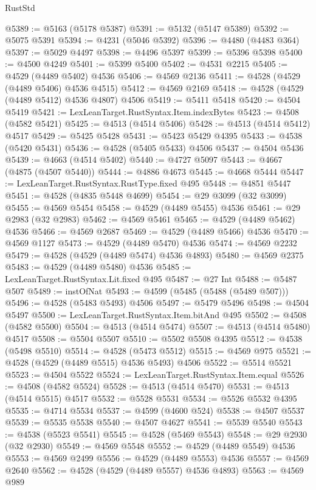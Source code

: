 \begin{lexlean}{RustStd}
\begin{coremodule}
@5389 := @5163 (@5178 @5387)
@5391 := @5132 (@5147 @5389)
@5392 := @5075 @5391
@5394 := @4231 (@5046 @5392)
@5396 := @4480 (@4483 @364)
@5397 := @5029 @4497
@5398 := @4496 @5397
@5399 := @5396 @5398
@5400 := @4500 @4249
@5401 := @5399 @5400
@5402 := @4531 @2215
@5405 := @4529 (@4489 @5402) @4536
@5406 := @4569 @2136
@5411 := @4528 (@4529 (@4489 @5406) @4536 @4515)
@5412 := @4569 @2169
@5418 := @4528 (@4529 (@4489 @5412) @4536 @4807) @4506
@5419 := @5411 @5418
@5420 := @4504 @5419
@5421 := LexLeanTarget.RustSyntax.Item.indexBytes
@5423 := @4508 (@4582 @5421)
@5425 := @4513 (@4514 @5406)
@5428 := @4513 (@4514 @5412) @4517
@5429 := @5425 @5428
@5431 := @5423 @5429 @4395
@5433 := @4538 (@5420 @5431)
@5436 := @4528 (@5405 @5433) @4506
@5437 := @4504 @5436
@5439 := @4663 (@4514 @5402)
@5440 := @4727 @5097
@5443 := @4667 (@4875 (@4507 @5440))
@5444 := @4886 @4673
@5445 := @4668 @5444
@5447 := LexLeanTarget.RustSyntax.RustType.fixed @495
@5448 := @4851 @5447
@5451 := @4528 (@4835 @5448 @4699)
@5454 := @29 @3099 (@32 @3099)
@5455 := @4569 @5454
@5458 := @4529 (@4489 @5455) @4536
@5461 := @29 @2983 (@32 @2983)
@5462 := @4569 @5461
@5465 := @4529 (@4489 @5462) @4536
@5466 := @4569 @2687
@5469 := @4529 (@4489 @5466) @4536
@5470 := @4569 @1127
@5473 := @4529 (@4489 @5470) @4536
@5474 := @4569 @2232
@5479 := @4528 (@4529 (@4489 @5474) @4536 @4893)
@5480 := @4569 @2375
@5483 := @4529 (@4489 @5480) @4536
@5485 := LexLeanTarget.RustSyntax.Lit.fixed @495
@5487 := @27 Int
@5488 := @5487 @507
@5489 := instOfNat
@5493 := @4599 (@5485 (@5488 (@5489 @507)))
@5496 := @4528 (@5483 @5493) @4506
@5497 := @5479 @5496
@5498 := @4504 @5497
@5500 := LexLeanTarget.RustSyntax.Item.bitAnd @495
@5502 := @4508 (@4582 @5500)
@5504 := @4513 (@4514 @5474)
@5507 := @4513 (@4514 @5480) @4517
@5508 := @5504 @5507
@5510 := @5502 @5508 @4395
@5512 := @4538 (@5498 @5510)
@5514 := @4528 (@5473 @5512)
@5515 := @4569 @975
@5521 := @4528 (@4529 (@4489 @5515) @4536 @5493) @4506
@5522 := @5514 @5521
@5523 := @4504 @5522
@5524 := LexLeanTarget.RustSyntax.Item.equal
@5526 := @4508 (@4582 @5524)
@5528 := @4513 (@4514 @5470)
@5531 := @4513 (@4514 @5515) @4517
@5532 := @5528 @5531
@5534 := @5526 @5532 @4395
@5535 := @4714 @5534
@5537 := @4599 (@4600 @524)
@5538 := @4507 @5537
@5539 := @5535 @5538
@5540 := @4507 @4627
@5541 := @5539 @5540
@5543 := @4538 (@5523 @5541)
@5545 := @4528 (@5469 @5543)
@5548 := @29 @2930 (@32 @2930)
@5549 := @4569 @5548
@5552 := @4529 (@4489 @5549) @4536
@5553 := @4569 @2499
@5556 := @4529 (@4489 @5553) @4536
@5557 := @4569 @2640
@5562 := @4528 (@4529 (@4489 @5557) @4536 @4893)
@5563 := @4569 @989

\end{coremodule}
\end{lexlean}
